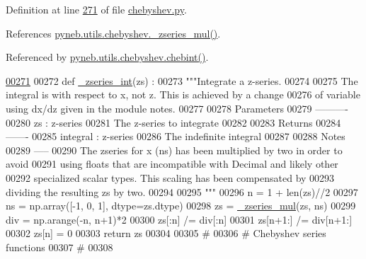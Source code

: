 Definition at line \hyperlink{chebyshev_8py_source_l00271}{271} of file \hyperlink{chebyshev_8py_source}{chebyshev.\-py}.



References \hyperlink{chebyshev_8py_source_l00148}{pyneb.\-utils.\-chebyshev.\-\_\-zseries\-\_\-mul()}.



Referenced by \hyperlink{chebyshev_8py_source_l00912}{pyneb.\-utils.\-chebyshev.\-chebint()}.


\begin{DoxyCode}
\hypertarget{namespacepyneb_1_1utils_1_1chebyshev_l00271}{}\hyperlink{namespacepyneb_1_1utils_1_1chebyshev_ac55f3063cff69831a2882a7a30b617d7}{00271} 
00272 \textcolor{keyword}{def }\hyperlink{namespacepyneb_1_1utils_1_1chebyshev_ac55f3063cff69831a2882a7a30b617d7}{\_zseries\_int}(zs) :
00273     \textcolor{stringliteral}{"""Integrate a z-series.}
00274 \textcolor{stringliteral}{}
00275 \textcolor{stringliteral}{    The integral is with respect to x, not z. This is achieved by a change}
00276 \textcolor{stringliteral}{    of variable using dx/dz given in the module notes.}
00277 \textcolor{stringliteral}{}
00278 \textcolor{stringliteral}{    Parameters}
00279 \textcolor{stringliteral}{    ----------}
00280 \textcolor{stringliteral}{    zs : z-series}
00281 \textcolor{stringliteral}{        The z-series to integrate}
00282 \textcolor{stringliteral}{}
00283 \textcolor{stringliteral}{    Returns}
00284 \textcolor{stringliteral}{    -------}
00285 \textcolor{stringliteral}{    integral : z-series}
00286 \textcolor{stringliteral}{        The indefinite integral}
00287 \textcolor{stringliteral}{}
00288 \textcolor{stringliteral}{    Notes}
00289 \textcolor{stringliteral}{    -----}
00290 \textcolor{stringliteral}{    The zseries for x (ns) has been multiplied by two in order to avoid}
00291 \textcolor{stringliteral}{    using floats that are incompatible with Decimal and likely other}
00292 \textcolor{stringliteral}{    specialized scalar types. This scaling has been compensated by}
00293 \textcolor{stringliteral}{    dividing the resulting zs by two.}
00294 \textcolor{stringliteral}{}
00295 \textcolor{stringliteral}{    """}
00296     n = 1 + len(zs)//2
00297     ns = np.array([-1, 0, 1], dtype=zs.dtype)
00298     zs = \hyperlink{namespacepyneb_1_1utils_1_1chebyshev_ac430f61f52899c1e2a276d8b76fa47d5}{\_zseries\_mul}(zs, ns)
00299     div = np.arange(-n, n+1)*2
00300     zs[:n] /= div[:n]
00301     zs[n+1:] /= div[n+1:]
00302     zs[n] = 0
00303     \textcolor{keywordflow}{return} zs
00304 
00305 \textcolor{comment}{#}
00306 \textcolor{comment}{# Chebyshev series functions}
00307 \textcolor{comment}{#}
00308 

\end{DoxyCode}
